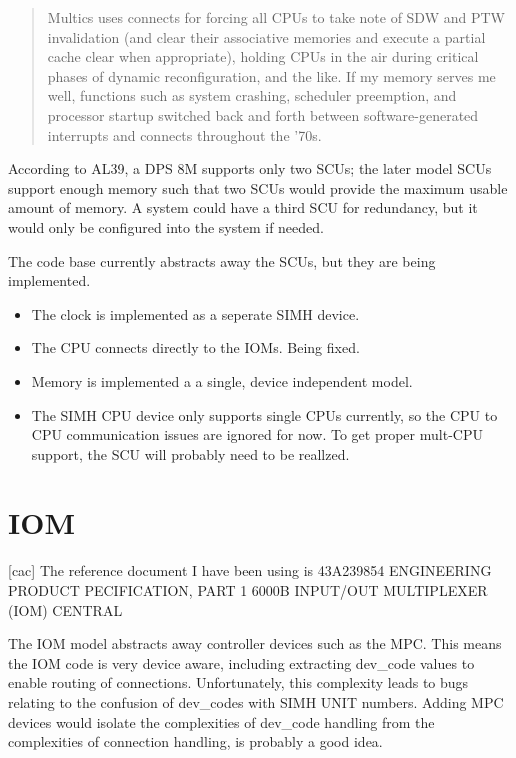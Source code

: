 \documentclass[notitlepage]{report}
\begin{document}
\begin{quote}
Multics uses connects for forcing all CPUs to take note of SDW and PTW
invalidation (and clear their associative memories and execute a partial cache
clear when appropriate), holding CPUs in the air during critical phases of
dynamic reconfiguration, and the like. If my memory serves me well, functions
such as system crashing, scheduler preemption, and processor startup switched
back and forth between software-generated interrupts and connects throughout
the '70s.
\end {quote}

According to AL39, a DPS 8M supports only two SCUs; the later model SCUs support enough memory such that two SCUs would provide the maximum usable amount of memory. A system could have a third SCU for redundancy, but it would only be configured into the system if needed.

The code base currently abstracts away the SCUs, but they are being implemented.


\begin{itemize}

\item The clock is implemented as a seperate SIMH device.

\item The CPU connects directly to the IOMs. Being fixed.

\item Memory is implemented a a single, device independent model.

\item The SIMH CPU device only supports single CPUs currently, so the CPU to CPU communication issues are ignored for now. To get proper mult-CPU support, the SCU will probably need to be reallzed.
\end {itemize}

\section {IOM}

[cac] The reference document I have been using is 43A239854 ENGINEERING PRODUCT PECIFICATION, PART 1 6000B INPUT/OUT MULTIPLEXER (IOM) CENTRAL

The IOM model abstracts away controller devices such as the MPC. This means the
IOM code is very device aware, including extracting dev\_code values to enable
routing of connections. Unfortunately, this complexity leads to bugs relating
to the confusion of dev\_codes with SIMH UNIT numbers. Adding MPC devices would
isolate the complexities of dev\_code handling from the complexities of
connection handling, is probably a good idea.
\end{document}
